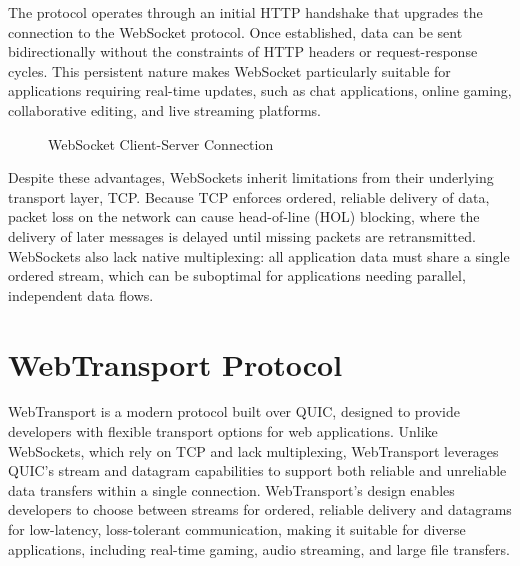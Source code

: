 The protocol operates through an initial HTTP handshake that upgrades the connection to the WebSocket protocol. Once established, data can be sent bidirectionally without the constraints of HTTP headers or request-response cycles. This persistent nature makes WebSocket particularly suitable for applications requiring real-time updates, such as chat applications, online gaming, collaborative editing, and live streaming platforms.


\begin{figure}[h]
\centering
{}
\caption{WebSocket Client-Server Connection}
\label{fig:websocket}
\end{figure}
Despite these advantages, WebSockets inherit limitations from their underlying transport layer, TCP. Because TCP enforces ordered, reliable delivery of data, packet loss on the network can cause head-of-line (HOL) blocking, where the delivery of later messages is delayed until missing packets are retransmitted. WebSockets also lack native multiplexing: all application data must share a single ordered stream, which can be suboptimal for applications needing parallel, independent data flows.

\section{WebTransport Protocol}

WebTransport is a modern protocol built over QUIC, designed to provide developers with flexible transport options for web applications. Unlike WebSockets, which rely on TCP and lack multiplexing, WebTransport leverages QUIC’s stream and datagram capabilities to support both reliable and unreliable data transfers within a single connection. WebTransport’s design enables developers to choose between streams for ordered, reliable delivery and datagrams for low-latency, loss-tolerant communication, making it suitable for diverse applications, including real-time gaming, audio streaming, and large file transfers.

